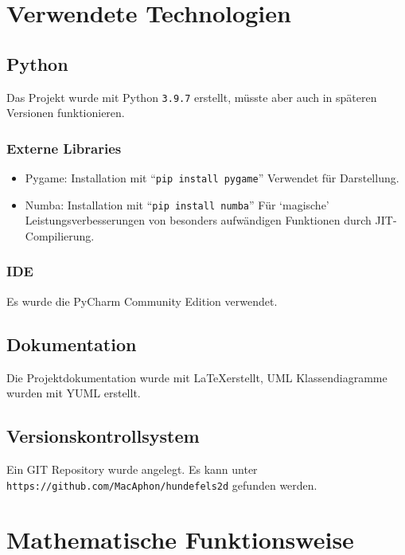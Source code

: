 \documentclass[a4paper,titlepage]{article}
\begin{document}
\newpage

\section{Verwendete Technologien}

\subsection{Python}

Das Projekt wurde mit Python \verb|3.9.7| erstellt, müsste aber auch in späteren Versionen funktionieren.

\subsubsection*{Externe Libraries}

\begin{itemize}
	\item Pygame: Installation mit ``\verb|pip install pygame|''
	Verwendet für Darstellung.
	\item Numba: Installation mit ``\verb|pip install numba|''
	Für `magische' Leistungsverbesserungen von besonders aufwändigen Funktionen durch JIT-Compilierung.
\end{itemize}

\subsubsection*{IDE}

Es wurde die PyCharm Community Edition verwendet.

\subsection{Dokumentation}

Die Projektdokumentation wurde mit \LaTeX erstellt,
UML Klassendiagramme wurden mit YUML erstellt.

\subsection{Versionskontrollsystem}

Ein GIT Repository wurde angelegt. Es kann unter \verb|https://github.com/MacAphon/hundefels2d| gefunden werden.

\newpage
\section{Mathematische Funktionsweise}
\end{document}
